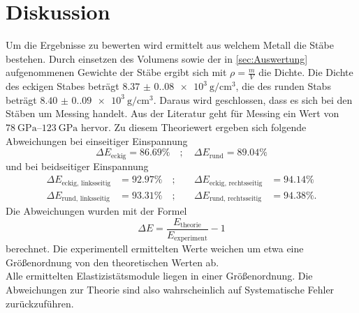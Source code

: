 \section{Diskussion}
\label{sec:Diskussion}

Um die Ergebnisse zu bewerten wird ermittelt aus welchem Metall die Stäbe bestehen. Durch einsetzen des Volumens sowie der in \autoref{sec:Auswertung}
aufgenommenen Gewichte der Stäbe ergibt sich mit $ρ = \frac{m}{V}$ die Dichte. Die Dichte des eckigen Stabes beträgt $\SI{8.37(0.08)e3}{\gram\per\centi\meter\cubed}$, die 
des runden Stabs beträgt $\SI{8.40(0.09)e3}{\gram\per\centi\meter\cubed}.$ Daraus wird geschlossen, dass es sich bei den Stäben um Messing handelt. 
Aus der Literatur\cite{chemie.de} geht für Messing ein Wert von $\SIrange{78}{123}{\giga\pascal}$ hervor.
Zu diesem Theoriewert ergeben sich folgende Abweichungen bei einseitiger Einspannung
\begin{equation*}
    ΔE_{\text{eckig}} = 86.69\% \quad ; \quad ΔE_{\text{rund}} = 89.04\%
\end{equation*} 
und bei beidseitiger Einspannung
\begin{align*}
    ΔE_{\text{eckig, linksseitig}} &= 92.97\% \quad ; &\quad ΔE_{\text{eckig, rechtsseitig}} &= 94.14\% \\
    ΔE_{\text{rund, linksseitig}} &= 93.31\% \quad ; &\quad ΔE_{\text{rund, rechtsseitig}} &= 94.38\%.
\end{align*}
Die Abweichungen wurden mit der Formel
\begin{equation*}
    ΔE = \frac{E_{\text{theorie}}}{E_{\text{experiment}}} - 1
\end{equation*} berechnet.
Die experimentell ermittelten Werte weichen um etwa eine Größenordnung von den theoretischen Werten ab.\\
Alle ermittelten Elastizistätsmodule liegen in einer Größenordnung. Die Abweichungen zur Theorie sind also 
wahrscheinlich auf Systematische Fehler zurückzuführen.\\
\\
